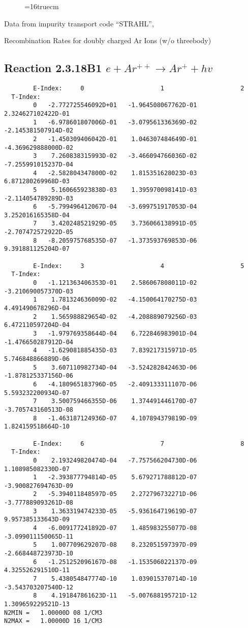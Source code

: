\documentclass[12pt,dvipdfmx]{article}
\begin{document}
\begin{figure} \label{2.3.18B0}
\epsfxsize=16truecm
\end{figure}
\newpage
Data from impurity transport code ``STRAHL'', \cite{kn:Behringer}

  Recombination Rates for doubly  charged Ar Ions (w/o threebody)
\subsection{
Reaction 2.3.18B1   $  e + Ar^{++} \rightarrow  Ar^+ + hv$
}


\begin{small}\begin{verbatim}
        E-Index:     0                     1                     2
  T-Index:
        0   -2.772725546092D+01   -1.964508067762D-01    2.324627102422D-01
        1   -6.978601807006D-01   -3.079561336369D-02   -2.145381507914D-02
        2   -1.450309406042D-01    1.046307484649D-01   -4.369629888000D-02
        3    7.260838315993D-02   -3.466094766036D-02   -7.255991015237D-04
        4   -2.582804347800D-02    1.815351628023D-03    6.871280269968D-03
        5    5.160665923838D-03    1.395970098141D-03   -2.114054789289D-03
        6   -5.799496412067D-04   -3.699751917053D-04    3.252016165358D-04
        7    3.420248521929D-05    3.736066138991D-05   -2.707472572922D-05
        8   -8.205975768535D-07   -1.373593769853D-06    9.391881125204D-07

        E-Index:     3                     4                     5
  T-Index:
        0   -1.121363406353D-01    2.586067808011D-02   -3.210690057370D-03
        1    1.781324636009D-02   -4.150064170275D-03    4.491490678296D-04
        2    1.565988829654D-02   -4.208889079256D-03    6.472110597204D-04
        3   -1.979769358644D-04    6.722846983901D-04   -1.476650287912D-04
        4   -1.629081885435D-03    7.839217315971D-05    5.746848866889D-06
        5    3.607110982734D-04   -3.524282842463D-06   -1.878125337156D-06
        6   -4.180965183796D-05   -2.409133311107D-06    5.593232200934D-07
        7    3.500759466355D-06    1.374491446170D-07   -3.705743160513D-08
        8   -1.463187124936D-07    4.107894379819D-09    1.824159518664D-10

        E-Index:     6                     7                     8
  T-Index:
        0    2.193249820474D-04   -7.757566204730D-06    1.108985082330D-07
        1   -2.393877794814D-05    5.679271788812D-07   -3.900827694763D-09
        2   -5.394011848597D-05    2.272796732271D-06   -3.777889093261D-08
        3    1.363319474233D-05   -5.936164719619D-07    9.957385133643D-09
        4   -6.009177241892D-07    1.485983255077D-08   -3.099011150065D-11
        5    1.007709629207D-08    8.232051597397D-09   -2.668448723973D-10
        6   -1.251252096167D-08   -1.153506022137D-09    4.325526291510D-11
        7    5.438054847774D-10    1.039015370714D-10   -3.543703207540D-12
        8    4.191847861623D-11   -5.007688195721D-12    1.309659229521D-13
N2MIN =   1.00000D 08 1/CM3
N2MAX =   1.00000D 16 1/CM3


\end{verbatim}
\end{small}
\end{document}
